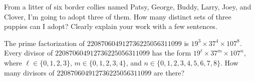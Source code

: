 \documentclass[12pt,fleqn,answers]{exam}
\begin{document}
\begin{questions}
     \question [2] From a litter of six border collies named Patsy, George, Buddy, Larry,
     Joey, and Clover, I'm going to adopt three of them. How many distinct sets of
     three puppies can I adopt?  Clearly explain your work with a few sentences.

     \begin{solution}

     \end{solution}
     \question [2] The prime factorization of $220870604912736225056311099$ is
     ${{19}^{3}} \times  {{37}^{4}} \times {{107}^{8}}$. Every divisor of $220870604912736225056311099$
     has the form $19^\ell \times 37^m \times 107^n$, where $\ell \in \{0,1,2,3\}$,
     $m \in \{0,1,2,3,4\}$, and $n \in \{0,1,2,3,4,5,6,7,8\}$. How many divisors of 
     $220870604912736225056311099$ are there?

     \begin{solution}

     \end{solution}

\end{questions}
\end{document}
